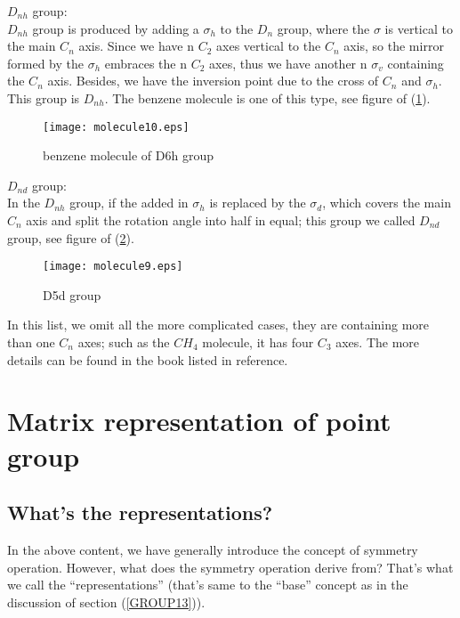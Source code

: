 $D_{nh}$ group: \\
$D_{nh}$ group is produced by adding a $\sigma_{h}$ to the $D_{n}$
group, where the $\sigma$ is vertical to the main $C_{n}$ axis.  Since
we have n $C_{2}$ axes vertical to the $C_{n}$ axis, so the mirror
formed by the $\sigma_{h}$ embraces the n $C_{2}$ axes, thus we have
another n $\sigma_{v}$ containing the $C_{n}$ axis.  Besides, we have
the inversion point due to the cross of $C_{n}$ and $\sigma_{h}$. This
group is $D_{nh}$. The benzene molecule is one of this type, see
figure of (\ref{GROUP10}).
\begin{figure}[htp]
  \begin{center}
    \texttt{[image: molecule10.eps]}
    \caption{benzene molecule of D6h group} \label{GROUP10}
  \end{center}
\end{figure}

$D_{nd}$ group: \\
In the $D_{nh}$ group, if the added in $\sigma_{h}$ is replaced by the
$\sigma_{d}$, which covers the main $C_{n}$ axis and split the
rotation angle into half in equal; this group we called $D_{nd}$
group, see figure of (\ref{GROUP9}).
\begin{figure}[htp]
  \begin{center}
    \texttt{[image: molecule9.eps]}
    \caption{D5d group} \label{GROUP9}
  \end{center}
\end{figure}

In this list, we omit all the more complicated cases, they are
containing more than one $C_{n}$ axes; such as the $CH_{4}$ molecule,
it has four $C_{3}$ axes. The more details can be found in the book
listed in reference\cite{Bishop, Cotton}.

\section{Matrix representation of point group}

\subsection{What's the representations?}
%
%
In the above content, we have generally introduce the concept of
symmetry operation. However, what does the symmetry operation derive
from? That's what we call the ``representations'' (that's same to the
``base'' concept as in the discussion of section (\ref{GROUP13})).

